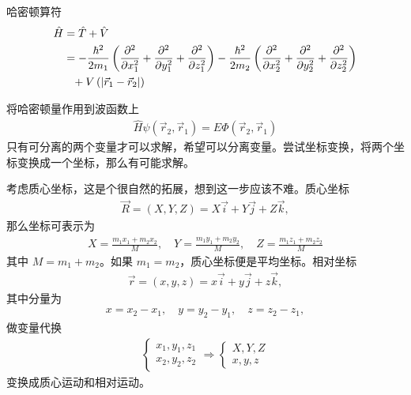 哈密顿算符
\begin{align}
    \hat H &= \hat T + \hat V \\
    &= -\frac{\hbar^2}{2m_1} \left(
        \pdv[2]{x_1} + \pdv[2]{y_1} + \pdv[2]{z_1}
    \right) 
    - \frac{\hbar^2}{2m_2} \left(
        \pdv[2]{x_2} + \pdv[2]{y_2} + \pdv[2]{z_2}
    \right) \notag\\
    &\phantom{=} + V\left(
        |\vec r_1 - \vec r_2|
        \right)
\end{align}

将哈密顿量作用到波函数上
\begin{align}
    \hat H \psi(\vec r_2, \vec r_1) = E \Phi (\vec r_2, \vec r_1)
\end{align}
只有可分离的两个变量才可以求解，希望可以分离变量。尝试坐标变换，将两个坐标变换成一个坐标，那么有可能求解。

考虑质心坐标，这是个很自然的拓展，想到这一步应该不难。质心坐标
\begin{align}
    \vec R = (X,Y,Z) = X \vec i + Y \vec j + Z \vec k,
\end{align}
那么坐标可表示为
\begin{align}
    X = \frac{m_1 x_1 + m_2 x_2}{M}, \quad Y = \frac{m_1 y_1 + m_2 y_2}{M}, \quad
    Z = \frac{m_1 z_1 + m_2 z_2}{M}
\end{align}
其中 $M = m_1 + m_2$。如果 $m_1 = m_2$，质心坐标便是平均坐标。相对坐标
\begin{align}
    \vec r = (x,y,z) = x \vec i + y \vec j + z \vec k,
\end{align}
其中分量为
\begin{align}
    x = x_2 - x_1, \quad y = y_2 - y_1, \quad z= z_2-z_1,
\end{align}
做变量代换
\begin{align}
    \begin{cases}
        x_1, y_1, z_1\\
        x_2, y_2, z_2
    \end{cases}
    \Rightarrow 
    \begin{cases}
        X,Y,Z\\
        x,y,z
    \end{cases}
\end{align}
变换成质心运动和相对运动。

